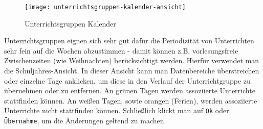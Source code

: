 \begin{wrapfigure}{r}{0.4\textwidth}
	\vspace{-14pt}
	\centering
	\texttt{[image: unterrichtsgruppen-kalender-ansicht]}
	\vspace{-5pt}
	\caption{Unterrichtsgruppen Kalender}
	\label{fig:unterrichtsgruppen-kalender-ansicht}
	\vspace{14pt}
\end{wrapfigure}

\noindent
Unterrichtsgruppen eignen sich sehr gut dafür die Periodizität von Unterrichten sehr fein auf die Wochen abzustimmen - damit können z.B. vorlesungsfreie Zwischenzeiten (wie Weihnachten) berücksichtigt werden. Hierfür verwendet man die Schuljahres-Ansicht. In dieser Ansicht kann man Datenbereiche überstreichen oder einzelne Tage anklicken, um diese in den Verlauf der Unterrichtgruppe zu übernehmen oder zu entfernen. An grünen Tagen werden assoziierte Unterrichte stattfinden können. An weißen Tagen, sowie orangen (Ferien), werden assoziierte Unterrichte nicht stattfinden können. Schließlich klickt man auf \texttt{Ok} oder \texttt{Übernahme}, um die Änderungen geltend zu machen.\\





